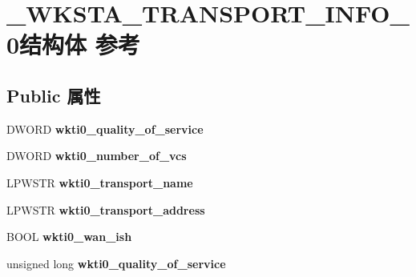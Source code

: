 \hypertarget{struct___w_k_s_t_a___t_r_a_n_s_p_o_r_t___i_n_f_o__0}{}\section{\+\_\+\+W\+K\+S\+T\+A\+\_\+\+T\+R\+A\+N\+S\+P\+O\+R\+T\+\_\+\+I\+N\+F\+O\+\_\+0结构体 参考}
\label{struct___w_k_s_t_a___t_r_a_n_s_p_o_r_t___i_n_f_o__0}
\subsection*{Public 属性}
\begin{DoxyCompactItemize}
\item 
\mbox{\label{struct___w_k_s_t_a___t_r_a_n_s_p_o_r_t___i_n_f_o__0_ac0bac6a90a7036624e151ef01ade13a5}} 
D\+W\+O\+RD {\bfseries wkti0\+\_\+quality\+\_\+of\+\_\+service}
\item 
\mbox{\label{struct___w_k_s_t_a___t_r_a_n_s_p_o_r_t___i_n_f_o__0_a2ef1c82624a8f90a9feb1e75a81947bd}} 
D\+W\+O\+RD {\bfseries wkti0\+\_\+number\+\_\+of\+\_\+vcs}
\item 
\mbox{\label{struct___w_k_s_t_a___t_r_a_n_s_p_o_r_t___i_n_f_o__0_aae45e9e98a2e1a8c055b653d8a9b2a5f}} 
L\+P\+W\+S\+TR {\bfseries wkti0\+\_\+transport\+\_\+name}
\item 
\mbox{\label{struct___w_k_s_t_a___t_r_a_n_s_p_o_r_t___i_n_f_o__0_a04197242e39523905c332410d269d9c4}} 
L\+P\+W\+S\+TR {\bfseries wkti0\+\_\+transport\+\_\+address}
\item 
\mbox{\label{struct___w_k_s_t_a___t_r_a_n_s_p_o_r_t___i_n_f_o__0_a36d7a8c29b0dccd8c10c87d36f7f3f1b}} 
B\+O\+OL {\bfseries wkti0\+\_\+wan\+\_\+ish}
\item 
\mbox{\label{struct___w_k_s_t_a___t_r_a_n_s_p_o_r_t___i_n_f_o__0_a8e7892ac13f0b117ddda46703516a74c}} 
unsigned long {\bfseries wkti0\+\_\+quality\+\_\+of\+\_\+service}

\end{DoxyCompactItemize}
